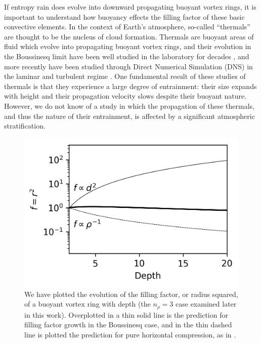 \documentclass[twocolumn, amsmath, amsfonts, amssymb, trackchanges]{aastex62}
\begin{document}
If entropy rain does evolve into downward propagating buoyant vortex rings, it is
important to understand how buoyancy effects the filling factor of these basic
convective elements. In the context of Earth's atmosphere, so-called ``thermals''
are thought to be the nucleus of cloud formation. Thermals are buoyant areas
of fluid which evolve into propagating buoyant vortex rings, and their
evolution in the Boussinesq limit have been well studied in the laboratory
for decades \citep[see e.g.][]{morton&all1956, scorer1957}, 
and more recently have been studied through
Direct Numerical Simulation (DNS) in the laminar and turbulent regime
\citep{lecoanet&jeevanjee2018}. One fundamental result of these studies of
thermals is that they experience a large degree of entrainment: their size expands
with height and their propagation velocity slows despite their buoyant nature.
However, we do not know of a study in which the propagation of these thermals,
and thus the nature of their entrainment, is affected by a 
significant atmospheric stratification.

\begin{figure}[t!]
    \includegraphics[width=\columnwidth]{overview_fig.png}
    \caption{We have plotted the evolution of the filling factor, or radius
	squared, of a buoyant vortex ring with depth (the $n_\rho = 3$ case examined
	later in this work). Overplotted in a thin
	solid line is the prediction for filling factor growth in the Boussinesq
	case, and in the thin dashed line is plotted the prediction for pure horizontal
	compression, as in \citet{brandenburg2016}.
    \label{fig:overview} }
\end{figure}
\end{document}
